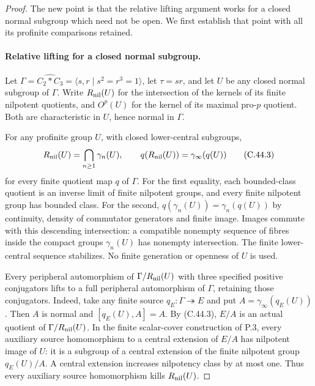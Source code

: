 \begin{proof}
The new point is that the relative lifting argument works for a
closed normal subgroup which need not be open. We first establish
that point with all its profinite comparisons retained.

\paragraph{Relative lifting for a closed normal subgroup.}
Let $\Gamma=\widehat{C_2*C_3}=\langle s,r\mid s^2=r^3=1\rangle$,
let $\tau=sr$, and let $U$ be any closed normal subgroup of $\Gamma$.
Write $R_{\rm nil}(U)$ for the intersection of the kernels of its
finite nilpotent quotients, and $O^p(U)$ for the kernel of its
maximal pro-$p$ quotient. Both are characteristic in $U$, hence
normal in $\Gamma$.

For any profinite group $U$, with closed lower-central subgroups,
\[
 R_{\rm nil}(U)=\bigcap_{n\ge1}\gamma_n(U),\qquad
 q(R_{\rm nil}(U))=\gamma_\infty(q(U))                  \tag{C.44.3}
\]
for every finite quotient map $q$ of $\Gamma$. For the first
equality, each bounded-class quotient is an inverse limit of finite
nilpotent groups, and every finite nilpotent group has bounded
class. For the second, $q(\gamma_n(U))=\gamma_n(q(U))$ by
continuity, density of commutator generators and finite image.
Images commute with this descending intersection: a compatible
nonempty sequence of fibres inside the compact groups
$\gamma_n(U)$ has nonempty intersection. The finite lower-central
sequence stabilizes. No finite generation or openness of $U$ is used.

Every peripheral automorphism of
$\Gamma/R_{\rm nil}(U)$ with three specified positive conjugators
lifts to a full peripheral automorphism of $\Gamma$, retaining
those conjugators. Indeed, take any finite source
$q_E:\Gamma\twoheadrightarrow E$ and put
$A=\gamma_\infty(q_E(U))$. Then $A$ is normal and
$[q_E(U),A]=A$. By (C.44.3), $E/A$ is an actual quotient of
$\Gamma/R_{\rm nil}(U)$. In the finite scalar-cover construction
of P.3, every auxiliary source homomorphism to a central extension
of $E/A$ has nilpotent image of $U$: it is a subgroup of a central
extension of the finite nilpotent group $q_E(U)/A$. A central
extension increases nilpotency class by at most one. Thus every
auxiliary source homomorphism kills $R_{\rm nil}(U)$.


\end{proof}
